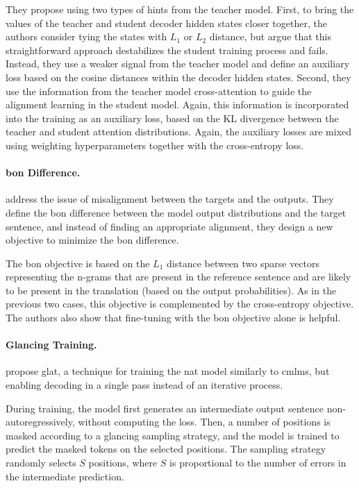 They propose using two types of hints from the teacher model. First, to bring
the values of the teacher and student decoder hidden states closer together,
the authors consider tying the states with $L_1$ or $L_2$ distance, but argue
that this straightforward approach destabilizes the student training process
and fails. Instead, they use a weaker signal from the teacher model and define
an auxiliary loss based on the cosine distances within the decoder hidden
states. Second, they use the information from the teacher model cross-attention
to guide the alignment learning in the student model. Again, this information
is incorporated into the training as an auxiliary loss, based on the KL
divergence between the teacher and student attention distributions.  Again, the
auxiliary losses are mixed using weighting hyperparameters together with the
cross-entropy loss.

\paragraph{\Acl{bon} Difference.} \citet{shao2020minimizing} address the issue
of misalignment between the targets and the outputs. They define the \ac{bon}
difference between the model output distributions and the target sentence, and
instead of finding an appropriate alignment, they design a new objective to
minimize the \ac{bon} difference.

The \ac{bon} objective is based on the $L_1$ distance between two sparse
vectors representing the n-grams that are present in the reference sentence and
are likely to be present in the translation (based on the output
probabilities). As in the previous two cases, this objective is complemented by
the cross-entropy objective. The authors also show that fine-tuning with the
\ac{bon} objective alone is helpful.

\paragraph{Glancing Training.} \citet{qian-etal-2021-glancing,
  qian2021volctrans} propose \acf{glat}, a technique for
training the \ac{nat} model similarly to \acp{cmlm}, but enabling decoding in a
single pass instead of an iterative process.

During training, the model first generates an intermediate output sentence
non-autoregressively, without computing the loss. Then, a number of positions
is masked according to a glancing sampling strategy, and the model is trained
to predict the masked tokens on the selected positions. The sampling strategy
randomly selects $S$ positions, where $S$ is proportional to the number of
errors in the intermediate prediction.

